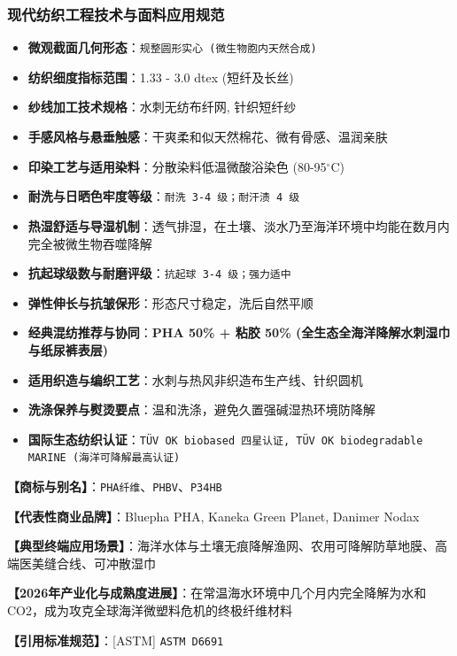 \documentclass[11pt,openright,twoside,UTF8]{ctexbook}
\begin{document}
\subsubsection*{现代纺织工程技术与面料应用规范}
\begin{itemize} \setlength{\itemsep}{2pt}
    \item \textbf{微观截面几何形态}：\texttt{规整圆形实心 (微生物胞内天然合成)}
    \item \textbf{纺织细度指标范围}：1.33 - 3.0 dtex (短纤及长丝)
    \item \textbf{纱线加工技术规格}：水刺无纺布纤网, 针织短纤纱
    \item \textbf{手感风格与悬垂触感}：干爽柔和似天然棉花、微有骨感、温润亲肤
    \item \textbf{印染工艺与适用染料}：分散染料低温微酸浴染色 (80-95$^\circ\mathrm{C}$)
    \item \textbf{耐洗与日晒色牢度等级}：\texttt{耐洗 3-4 级；耐汗渍 4 级}
    \item \textbf{热湿舒适与导湿机制}：透气排湿，在土壤、淡水乃至海洋环境中均能在数月内完全被微生物吞噬降解
    \item \textbf{抗起球级数与耐磨评级}：\texttt{抗起球 3-4 级；强力适中}
    \item \textbf{弹性伸长与抗皱保形}：形态尺寸稳定，洗后自然平顺
    \item \textbf{经典混纺推荐与协同}：\textbf{PHA 50\% + 粘胶 50\% (全生态全海洋降解水刺湿巾与纸尿裤表层)}
    \item \textbf{适用织造与编织工艺}：水刺与热风非织造布生产线、针织圆机
    \item \textbf{洗涤保养与熨烫要点}：温和洗涤，避免久置强碱湿热环境防降解
    \item \textbf{国际生态纺织认证}：\texttt{TÜV OK biobased 四星认证, TÜV OK biodegradable MARINE (海洋可降解最高认证)}
\end{itemize}
\vspace{0.2cm}

\noindent\textbf{【商标与别名】}：\texttt{PHA纤维}、\texttt{PHBV}、\texttt{P34HB}\par
\noindent\textbf{【代表性商业品牌】}：Bluepha PHA, Kaneka Green Planet, Danimer Nodax\par
\noindent\textbf{【典型终端应用场景】}：海洋水体与土壤无痕降解渔网、农用可降解防草地膜、高端医美缝合线、可冲散湿巾\par
\noindent\textbf{【2026年产业化与成熟度进展】}：在常温海水环境中几个月内完全降解为水和CO2，成为攻克全球海洋微塑料危机的终极纤维材料\par
\noindent\textbf{【引用标准规范】}：[ASTM] \texttt{ASTM D6691}\par
\vspace{0.5cm}
\end{document}
